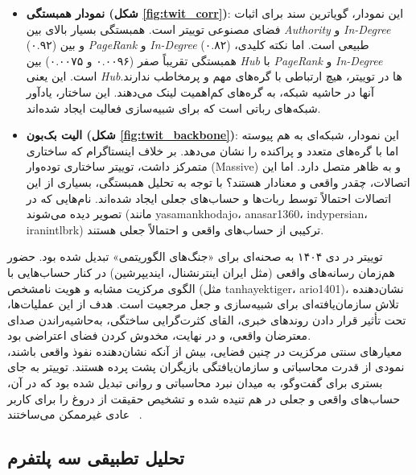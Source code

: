 \documentclass{article}
\begin{document}
	\begin{itemize}
		\item \textbf{نمودار همبستگی (شکل \ref{fig:twit_corr})}: این نمودار، گویاترین سند برای اثبات فضای مصنوعی توییتر است. همبستگی بسیار بالای بین \textit{Authority} و \textit{In-Degree} (۰.۹۲) و بین \textit{PageRank} و \textit{In-Degree} (۰.۸۲) طبیعی است. اما نکته کلیدی، همبستگی تقریباً صفر (۰.۰۰۹۶ و ۰.۰۰۷۵) بین \textit{Hub} با \textit{PageRank} و \textit{In-Degree} است. این یعنی \textit{Hub}ها در توییتر، هیچ ارتباطی با گره‌های مهم و پرمخاطب ندارند. آنها در حاشیه شبکه، به گره‌های کم‌اهمیت لینک می‌دهند. این ساختار، یادآور شبکه‌های رباتی است که برای شبیه‌سازی فعالیت ایجاد شده‌اند.
		\item \textbf{الیت بک‌بون (شکل \ref{fig:twit_backbone})}: این نمودار، شبکه‌ای به هم پیوسته اما با گره‌های متعدد و پراکنده را نشان می‌دهد. بر خلاف اینستاگرام که ساختاری متمرکز داشت، توییتر ساختاری توده‌وار (Massive) و به ظاهر متصل دارد. اما این اتصالات، چقدر واقعی و معنادار هستند؟ با توجه به تحلیل همبستگی، بسیاری از این اتصالات احتمالاً توسط ربات‌ها و حساب‌های جعلی ایجاد شده‌اند. نام‌هایی که در تصویر دیده می‌شوند (مانند yasamankhodajo، anasar1360، indypersian، iranintlbrk) ترکیبی از حساب‌های واقعی و احتمالاً جعلی هستند.
	\end{itemize}
	توییتر در دی ۱۴۰۴ به صحنه‌ای برای «جنگ‌های الگوریتمی» تبدیل شده بود. حضور هم‌زمان رسانه‌های واقعی (مثل ایران اینترنشنال، ایندیپرشین) در کنار حساب‌هایی با الگوی مرکزیت مشابه و هویت نامشخص (مثل tanhayektiger، ario1401)، نشان‌دهنده تلاش سازمان‌یافته‌ای برای شبیه‌سازی و جعل مرجعیت است. هدف از این عملیات‌ها، تحت تأثیر قرار دادن روندهای خبری، القای کثرت‌گرایی ساختگی، به‌حاشیه‌راندن صدای معترضان واقعی، و در نهایت، مخدوش کردن فضای اعتراضی بود.
	\\
	معیارهای سنتی مرکزیت در چنین فضایی، بیش از آنکه نشان‌دهنده نفوذ واقعی باشند، نمودی از قدرت محاسباتی و سازمان‌یافتگی بازیگران پشت پرده هستند. توییتر به جای بستری برای گفت‌وگو، به میدان نبرد محاسباتی و روانی تبدیل شده بود که در آن، حساب‌های واقعی و جعلی در هم تنیده شده و تشخیص حقیقت از دروغ را برای کاربر عادی غیرممکن می‌ساختند ~\cite{newman2003structure}.
	
	\newpage
	\subsection{تحلیل تطبیقی سه پلتفرم}
	
\end{document}
